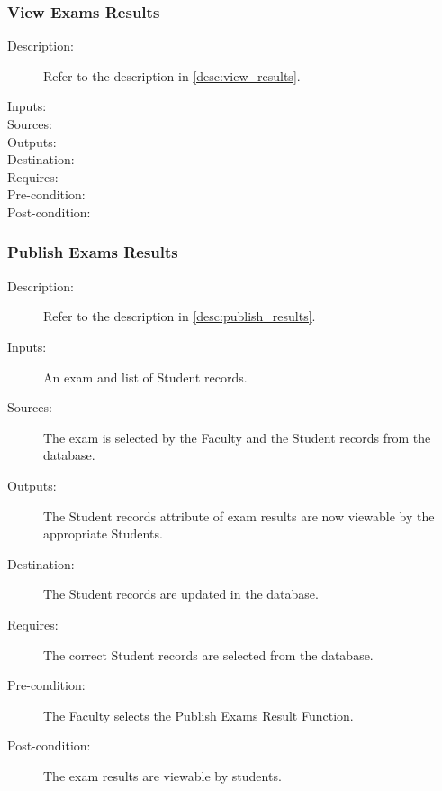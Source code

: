\subsubsection{\large View Exams Results} 
\begin{boxed} %
\begin{description}
\item[Description:]
   Refer to the description in \autoref{desc:view_results}.
\item[Inputs:]
\item[Sources:]
\item[Outputs:]
\item[Destination:]
\item[Requires:]
\item[Pre-condition:]
\item[Post-condition:]
\end{description}
\end{boxed} %

\subsubsection{\large Publish Exams Results} 
\begin{boxed} %
\begin{description}
\item[Description:]
   Refer to the description in \autoref{desc:publish_results}.
\item[Inputs:]
   An exam and list of Student records.
\item[Sources:]
   The exam is selected by the Faculty and the Student records 
   from the database.
\item[Outputs:]
   The Student records attribute of exam results are now viewable by the
   appropriate Students.
\item[Destination:]
   The Student records are updated in the database.
\item[Requires:]
   The correct Student records are selected from the database.
\item[Pre-condition:]
   The Faculty selects the Publish Exams Result Function.
\item[Post-condition:]
   The exam results are viewable by students.
\end{description}
\end{boxed} %

